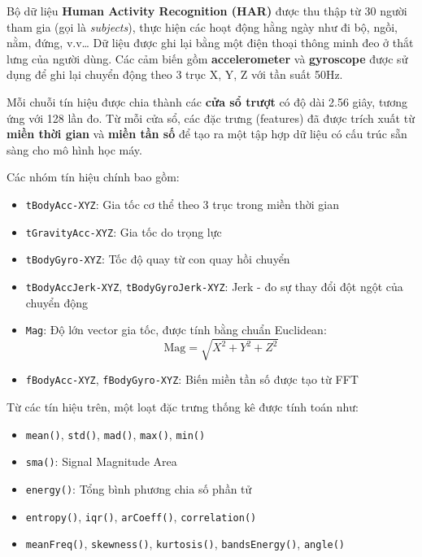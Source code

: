 \documentclass[
]{article}
\providecommand{\tightlist}{%
  \setlength{\itemsep}{0pt}\setlength{\parskip}{0pt}}
\begin{document}
Bộ dữ liệu \textbf{Human Activity Recognition (HAR)} được thu thập từ 30
người tham gia (gọi là \emph{subjects}), thực hiện các hoạt động hằng
ngày như đi bộ, ngồi, nằm, đứng, v.v\ldots{} Dữ liệu được ghi lại bằng
một điện thoại thông minh đeo ở thắt lưng của người dùng. Các cảm biến
gồm \textbf{accelerometer} và \textbf{gyroscope} được sử dụng để ghi lại
chuyển động theo 3 trục X, Y, Z với tần suất 50Hz.

Mỗi chuỗi tín hiệu được chia thành các \textbf{cửa sổ trượt} có độ dài
2.56 giây, tương ứng với 128 lần đo. Từ mỗi cửa sổ, các đặc trưng
(features) đã được trích xuất từ \textbf{miền thời gian} và \textbf{miền
tần số} để tạo ra một tập hợp dữ liệu có cấu trúc sẵn sàng cho mô hình
học máy.

Các nhóm tín hiệu chính bao gồm:

\begin{itemize}
\tightlist
\item
  \texttt{tBodyAcc-XYZ}: Gia tốc cơ thể theo 3 trục trong miền thời
  gian\\
\item
  \texttt{tGravityAcc-XYZ}: Gia tốc do trọng lực\\
\item
  \texttt{tBodyGyro-XYZ}: Tốc độ quay từ con quay hồi chuyển\\
\item
  \texttt{tBodyAccJerk-XYZ}, \texttt{tBodyGyroJerk-XYZ}: Jerk - đo sự
  thay đổi đột ngột của chuyển động\\
\item
  \texttt{Mag}: Độ lớn vector gia tốc, được tính bằng chuẩn Euclidean:\\
  \[
  \text{Mag} = \sqrt{X^2 + Y^2 + Z^2}
  \]
\item
  \texttt{fBodyAcc-XYZ}, \texttt{fBodyGyro-XYZ}: Biến miền tần số được
  tạo từ FFT
\end{itemize}

Từ các tín hiệu trên, một loạt đặc trưng thống kê được tính toán như:

\begin{itemize}
\tightlist
\item
  \texttt{mean()}, \texttt{std()}, \texttt{mad()}, \texttt{max()},
  \texttt{min()}
\item
  \texttt{sma()}: Signal Magnitude Area
\item
  \texttt{energy()}: Tổng bình phương chia số phần tử
\item
  \texttt{entropy()}, \texttt{iqr()}, \texttt{arCoeff()},
  \texttt{correlation()}
\item
  \texttt{meanFreq()}, \texttt{skewness()}, \texttt{kurtosis()},
  \texttt{bandsEnergy()}, \texttt{angle()}
\end{itemize}
\end{document}
